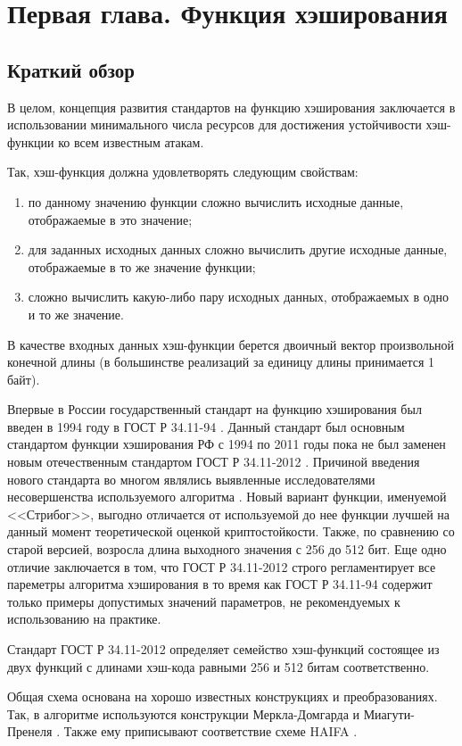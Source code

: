 \chapter{Первая глава. Функция хэширования}
\label{cha:ch_1}
\section{Краткий обзор}
\par
В целом, концепция развития стандартов на функцию хэширования заключается в использовании минимального числа ресурсов для достижения устойчивости хэш-функции ко всем известным атакам.
\par
Так, хэш-функция должна удовлетворять следующим свойствам:
\begin{enumerate}
	\item по данному значению функции сложно вычислить исходные данные, отображаемые в это значение;
	\item для заданных исходных данных сложно вычислить другие исходные данные, отображаемые в то же значение функции;
	\item сложно вычислить какую-либо пару исходных данных, отображаемых в одно и то же значение.
\end{enumerate}
\par
В качестве входных данных хэш-функции берется двоичный вектор произвольной конечной длины (в большинстве реализаций за единицу длины принимается 1 байт).
\par
Впервые в России государственный стандарт на функцию хэширования был введен в 1994 году в ГОСТ Р 34.11-94 \cite{GOST34111994}. Данный стандарт был основным стандартом функции хэширования РФ с 1994 по 2011 годы пока не был заменен новым отечественным стандартом ГОСТ Р 34.11-2012 \cite{GOSTR34112012}. Причиной введения нового стандарта во многом являлись выявленные исследователями несовершенства используемого алгоритма \cite{GOST34111994Cryptoanalysis}.
Новый вариант функции, именуемой <<Стрибог>>, выгодно отличается от используемой до нее функции лучшей на данный момент теоретической оценкой криптостойкости. Также, по сравнению со старой версией, возросла длина выходного значения с 256 до 512 бит. Еще одно отличие заключается в том, что ГОСТ Р 34.11-2012 строго регламентирует все пареметры алгоритма хэширования в то время как ГОСТ Р 34.11-94 содержит только примеры допустимых значений параметров, не рекомендуемых к использованию на практике.
\par
Стандарт ГОСТ Р 34.11-2012 определяет семейство хэш-функций состоящее из двух функций с длинами хэш-кода равными 256 и 512 битам соответственно.
\par
Общая схема основана на хорошо известных конструкциях и преобразованиях. Так, в алгоритме используются конструкции Меркла-Домгарда \cite{RCMerkle} и Миагути-Пренеля \cite{MiyaguchiS}. Также ему приписывают соответствие схеме HAIFA \cite{HAIFA}.
\newpage
